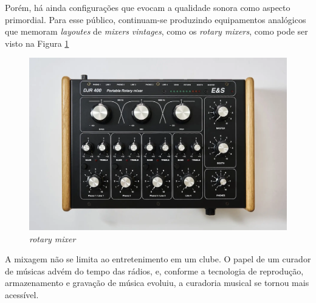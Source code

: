 Porém, há ainda configurações que evocam a qualidade sonora como aspecto primordial. Para esse público, continuam-se produzindo equipamentos analógicos que memoram \textit{layoutes} de \textit{mixers} \textit{vintages}, como os \textit{rotary mixers}, como pode ser visto na Figura \ref{fig18}

\begin{figure}[h]
	\centering
    \includegraphics[scale=0.2]{figuras/fig18.png}
	\caption{\textit{rotary mixer} \cite{electroniquespectacleampAUDIO}}
	\label{fig18}
\end{figure}

\par
A mixagem não se limita ao entretenimento em um clube. O papel de um curador de músicas advém do tempo das rádios, e, conforme a tecnologia de reprodução, armazenamento e gravação de música evoluiu, a curadoria musical se tornou mais acessível. 

